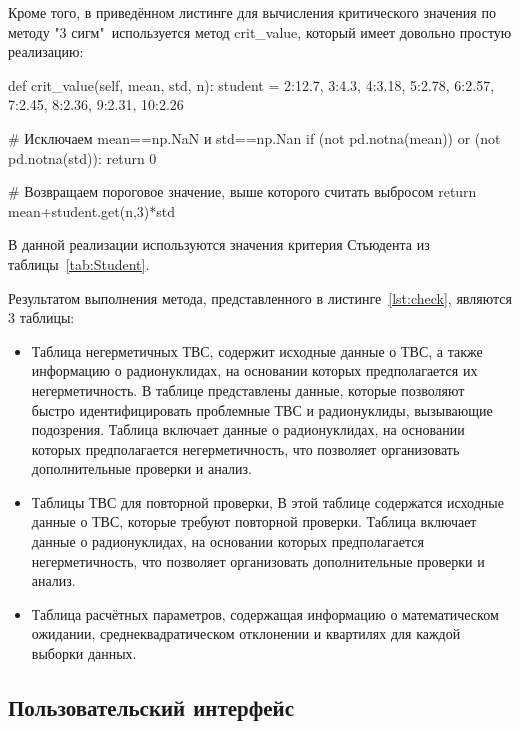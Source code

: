 Кроме того, в приведённом листинге для вычисления критического значения по методу "3 сигм"\ используется метод crit\_value, который имеет довольно простую реализацию:

\begin{flushleft}
 \label{lst:сrit_value}
\begin{MyCodes}
	
def crit_value(self, mean, std, n):
	student = {2:12.7, 3:4.3, 4:3.18, 5:2.78, 6:2.57, 7:2.45,
		8:2.36, 9:2.31, 10:2.26}
	
	# Исключаем mean==np.NaN и std==np.Nan
	if (not pd.notna(mean)) or (not pd.notna(std)): return 0
	
	# Возвращаем пороговое значение, выше которого считать выбросом
	return mean+student.get(n,3)*std
	
\end{MyCodes}
\end{flushleft}

В данной реализации используются значения критерия Стьюдента из таблицы~\ref{tab:Student}.

Результатом выполнения метода, представленного в листинге~\ref{lst:check}, являются 3 таблицы:

\begin{itemize}
	\item Таблица негерметичных ТВС, содержит исходные данные о ТВС, а также информацию о радионуклидах, на основании которых предполагается их негерметичность. В таблице представлены данные, которые позволяют быстро идентифицировать проблемные ТВС и радионуклиды, вызывающие подозрения. Таблица включает данные о радионуклидах, на основании которых предполагается негерметичность, что позволяет организовать дополнительные проверки и анализ. 
	
	\item Таблицы ТВС для повторной проверки, В этой таблице содержатся исходные данные о ТВС, которые требуют повторной проверки. Таблица включает данные о радионуклидах, на основании которых предполагается негерметичность, что позволяет организовать дополнительные проверки и анализ. 
	
	\item Таблица расчётных параметров, содержащая информацию о математическом ожидании, среднеквадратическом отклонении и квартилях для каждой выборки данных.
\end{itemize}

\subsection{Пользовательский интерфейс}

